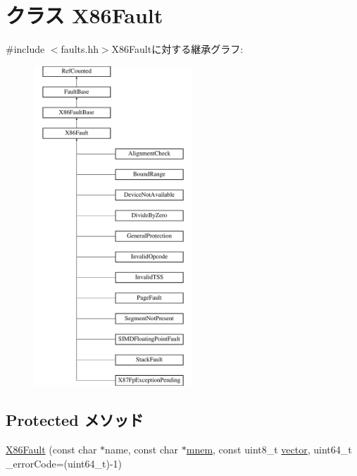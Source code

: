 \hypertarget{classX86ISA_1_1X86Fault}{
\section{クラス X86Fault}
\label{classX86ISA_1_1X86Fault}
}


{\ttfamily \#include $<$faults.hh$>$}X86Faultに対する継承グラフ:\begin{figure}[H]
\begin{center}
\leavevmode
\includegraphics[height=12cm]{classX86ISA_1_1X86Fault}
\end{center}
\end{figure}
\subsection*{Protected メソッド}
\begin{DoxyCompactItemize}
\item 
\hyperlink{classX86ISA_1_1X86Fault_a19b766538cd8ae6fb9a7d9d79a08d009}{X86Fault} (const char $\ast$name, const char $\ast$\hyperlink{classX86ISA_1_1X86FaultBase_a7bb17f43dadf35d103ef6a25b64c4e9f}{mnem}, const uint8\_\-t \hyperlink{classX86ISA_1_1X86FaultBase_ae369101f45bd256ca2745204afe38a47}{vector}, uint64\_\-t \_\-errorCode=(uint64\_\-t)-\/1)
\end{DoxyCompactItemize}


